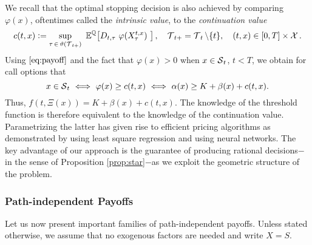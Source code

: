 \begin{remark}
We recall that the optimal stopping decision is also achieved by comparing %
$\varphi(x)$, oftentimes called the \textit{intrinsic value}, to the \textit{continuation value}
\begin{equation} \label{eq:contValue}
c(t,x) := \underset{\tau \, \in\,  \vartheta(\calT_{t+})}{\text{sup}} \
\E^{\Q}\! \left[ D_{t,\tau}\ \varphi(X^{t,x}_\tau)\ \right],\quad  \calT_{t+} = \calT_t \setminus\{t\}, \quad (t,x)\in [0,T]\times \calX.
\end{equation}
Using $\eqref{eq:payoff}$ and the fact that $\varphi(x)>0$ when $x\in \operatorname{\mathcal{S}}_t$, $t<T$, we obtain for call options that  
$$x \in \calS_t \ \Longleftrightarrow \ \varphi(x) \ge c(t,x) \ \Longleftrightarrow \ \alpha(x) \ge K + \beta(x) + c(t,x).$$
Thus, $f(t,\Xi(x)) = K+ \beta(x)  +  c(t,x)$. The knowledge of the threshold function is therefore equivalent to the knowledge of the continuation value.  Parametrizing  the latter
 has given rise to efficient pricing algorithms as demonstrated by \citet{LSMC} using least square regression and 
 \citet{Kohler} using neural networks.
The key advantage of our  approach  is the guarantee of producing  rational decisions$-$in the sense of Proposition \ref{prop:star}$-$as we exploit the geometric structure of the problem. %
\end{remark}


\subsubsection*{Path-independent Payoffs}
Let us now present important families of path-independent payoffs. Unless stated otherwise,  we assume that no exogenous factors are needed  and write $X=S$. %

